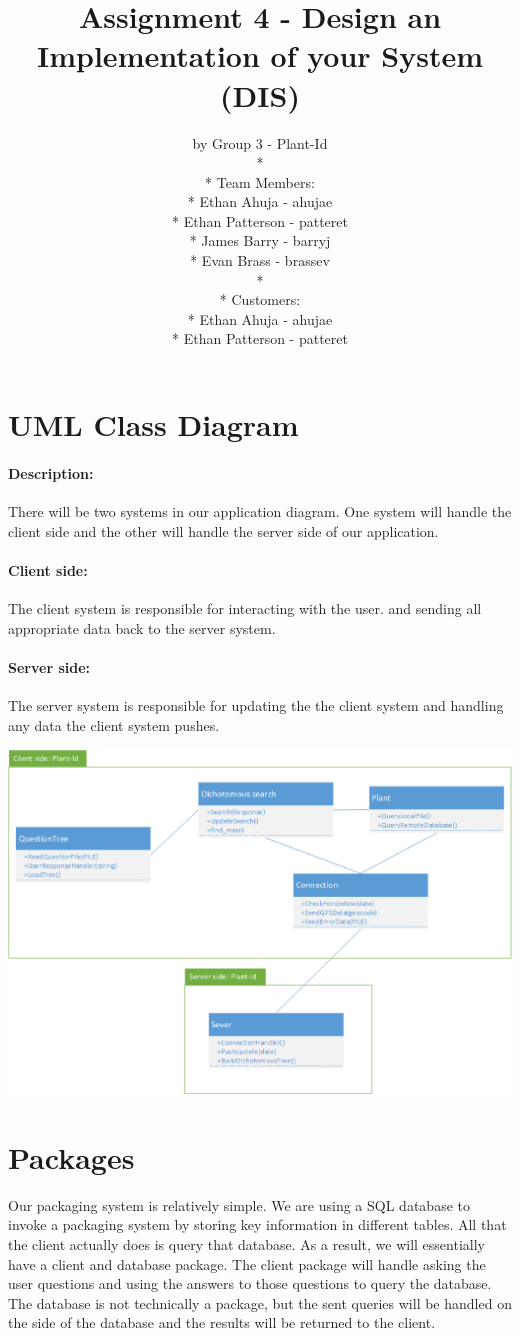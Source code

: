 \documentclass[a4paper]{article}
\title{Assignment 4 - Design an Implementation of your System (DIS)}
\author{ by Group 3 - Plant-Id \\* \\* Team Members: \\* Ethan Ahuja - ahujae \\* Ethan Patterson - patteret \\* James Barry - barryj \\* Evan Brass - brassev \\* \\* Customers: \\* Ethan Ahuja - ahujae \\* Ethan Patterson - patteret}
\begin{document}
\maketitle
\pagebreak
\tableofcontents
\pagebreak
\section{UML Class Diagram}
\paragraph{Description:}
There will be two systems in our application diagram. One system will handle the client side and the other will handle the server side of our application.
\paragraph{Client side:}
The client system is responsible for interacting with the user. and sending all appropriate data back to the server system.
\paragraph{Server side:}
The server system is responsible for updating the the client system and handling any data the client system pushes.
\begin{center}\includegraphics[scale=.7]{UML.eps}\end{center}
\pagebreak
\section{Packages}
Our packaging system is relatively simple. We are using a SQL database to invoke a packaging system by storing key information in different tables. All that the client actually does is query that database. As a result, we will essentially have a client and database package. The client package will handle asking the user questions and using the answers to those questions to query the database. The database is not technically a package, but the sent queries will be handled on the side of the database and the results will be returned to the client. 
\end{document}
